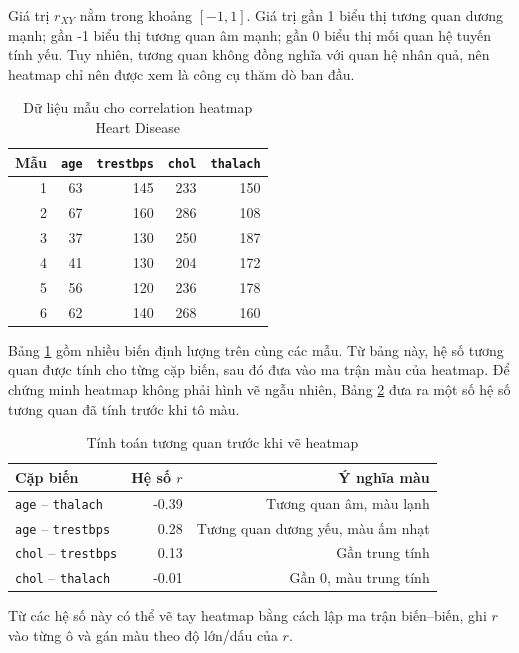 Giá trị $r_{XY}$ nằm trong khoảng $[-1, 1]$. Giá trị gần 1 biểu thị tương quan dương mạnh; gần -1 biểu thị tương quan âm mạnh; gần 0 biểu thị mối quan hệ tuyến tính yếu. Tuy nhiên, tương quan không đồng nghĩa với quan hệ nhân quả, nên heatmap chỉ nên được xem là công cụ thăm dò ban đầu.

\begin{table}[H]
\centering
\caption{Dữ liệu mẫu cho correlation heatmap Heart Disease}
\label{tab:chapter1_heatmap_sample_data}
\small
\begin{tabular}{rrrrr}
\toprule
Mẫu & \texttt{age} & \texttt{trestbps} & \texttt{chol} & \texttt{thalach} \\
\midrule
1 & 63 & 145 & 233 & 150 \\
2 & 67 & 160 & 286 & 108 \\
3 & 37 & 130 & 250 & 187 \\
4 & 41 & 130 & 204 & 172 \\
5 & 56 & 120 & 236 & 178 \\
6 & 62 & 140 & 268 & 160 \\
\bottomrule
\end{tabular}
\end{table}

Bảng \ref{tab:chapter1_heatmap_sample_data} gồm nhiều biến định lượng trên cùng các mẫu. Từ bảng này, hệ số tương quan được tính cho từng cặp biến, sau đó đưa vào ma trận màu của heatmap. Để chứng minh heatmap không phải hình vẽ ngẫu nhiên, Bảng \ref{tab:chapter1_heatmap_calc} đưa ra một số hệ số tương quan đã tính trước khi tô màu.

\begin{table}[H]
\centering
\caption{Tính toán tương quan trước khi vẽ heatmap}
\label{tab:chapter1_heatmap_calc}
\small
\begin{tabular}{lrr}
\toprule
Cặp biến & Hệ số $r$ & Ý nghĩa màu \\
\midrule
\texttt{age} -- \texttt{thalach} & -0.39 & Tương quan âm, màu lạnh \\
\texttt{age} -- \texttt{trestbps} & 0.28 & Tương quan dương yếu, màu ấm nhạt \\
\texttt{chol} -- \texttt{trestbps} & 0.13 & Gần trung tính \\
\texttt{chol} -- \texttt{thalach} & -0.01 & Gần 0, màu trung tính \\
\bottomrule
\end{tabular}
\end{table}

Từ các hệ số này có thể vẽ tay heatmap bằng cách lập ma trận biến--biến, ghi $r$ vào từng ô và gán màu theo độ lớn/dấu của $r$.

